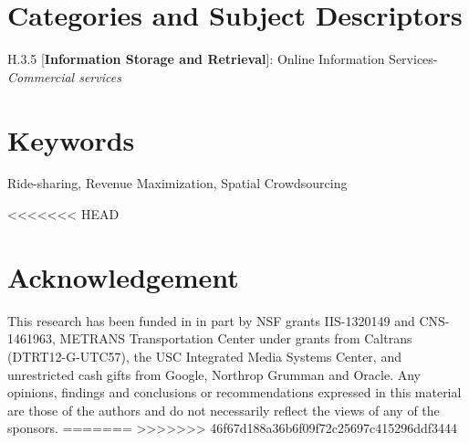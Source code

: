 \documentclass[letterpaper]{sig-alternate-05-2015}
\begin{document}
\vspace{-0.15in}
\section*{Categories and Subject Descriptors}
\vspace{-0.025in}
H.3.5 [\textbf{Information Storage and Retrieval}]: Online Information Services-\textit{Commercial services}

\vspace{-0.1in}
\section*{Keywords}
\vspace{-0.025in}
Ride-sharing, Revenue Maximization, Spatial Crowdsourcing




%

%





<<<<<<< HEAD
\section*{Acknowledgement}
This research has been funded in in part by NSF grants IIS-1320149 and CNS-1461963, METRANS Transportation Center under grants from Caltrans (DTRT12-G-UTC57), the USC Integrated Media Systems Center, and unrestricted cash gifts from Google, Northrop Grumman and Oracle. Any opinions, findings and conclusions or recommendations expressed in this material are those of the authors and do not necessarily reflect the views of any of the sponsors.
=======
>>>>>>> 46f67d188a36b6f09f72c25697c415296ddf3444

\begin{scriptsize}


\end{scriptsize}
\end{document}
